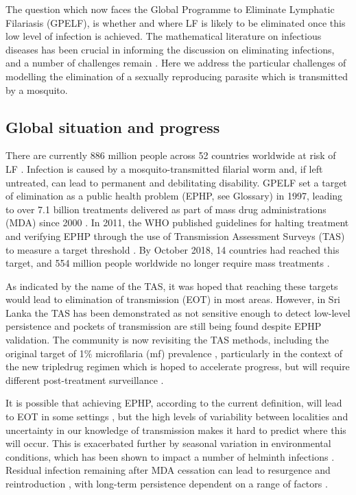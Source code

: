 The question which now faces the Global Programme to Eliminate Lymphatic Filariasis (GPELF), is whether and where LF is likely to be eliminated once this low level of infection is achieved. The mathematical literature on infectious diseases has been crucial in informing the discussion on eliminating infections, and a number of challenges remain \cite{Klepac2015}. Here we address the particular challenges of modelling the elimination of a sexually reproducing parasite which is transmitted by a mosquito.

\subsection[Global situation]{Global situation and progress}

There are currently 886 million people across 52 countries worldwide at risk of LF \cite{WHO2019_FactSheet}. Infection is caused by a mosquito-transmitted filarial worm and, if left untreated, can lead to permanent and debilitating disability. GPELF set a target of elimination as a public health problem (EPHP, see Glossary) in 1997, leading to over 7.1 billion treatments delivered as part of mass drug administrations (MDA) since 2000 \cite{WHO2017_GPELF}. In 2011, the WHO published guidelines for halting treatment and verifying EPHP through the use of Transmission Assessment Surveys (TAS) to measure a target threshold \cite{WHO2017_Validation,WHO2017_Alternatives}. By October 2018, 14 countries had reached this target, and 554 million people worldwide no longer require mass treatments \cite{WHO2019_FactSheet}.

As indicated by the name of the TAS, it was hoped that reaching these targets would lead to elimination of transmission (EOT) in most areas. However, in Sri Lanka the TAS has been demonstrated as not sensitive enough to detect low-level persistence \cite{rao2014,rebollo2015} and pockets of transmission are still being found despite EPHP validation. The community is now revisiting the TAS methods, including the original target of 1\% microfilaria (mf) prevalence \cite{WHO2016}, particularly in the context of the new \gls{tripledrug} regimen which is hoped to accelerate progress, but will require different post-treatment surveillance \cite{Irvine2017_Tripledrug}.

It is possible that achieving EPHP, according to the current definition, will lead to EOT in some settings \cite{DeJian2013,Won2018}, but the high levels of variability between localities and uncertainty in our knowledge of transmission makes it hard to predict where this will occur. This is exacerbated further by seasonal variation in environmental conditions, which has been shown to impact a number of helminth infections \cite{Davis2018,White2011}. Residual infection remaining after MDA cessation can lead to resurgence and reintroduction \cite{Xu2019,Singh2015}, with long-term persistence dependent on a range of factors \cite{Minetti2019}.

